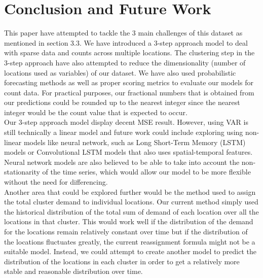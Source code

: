 \documentclass[nonblindrev,msom]{informs3} %
\begin{document}
\section{Conclusion and Future Work}

This paper have attempted to tackle the 3 main challenges of this dataset as mentioned in section 3.3. We have introduced a 3-step approach model to deal with sparse data and counts across multiple locations. The clustering step in the 3-step approach have also attempted to reduce the dimensionality (number of locations used as variables) of our dataset. We have also used probabilistic forecasting methods as well as proper scoring metrics to evaluate our models for count data. For practical purposes, our fractional numbers that is obtained from our predictions could be rounded up to the nearest integer since the nearest integer would be the count value that is expected to occur. \\

\noindent Our 3-step approach model display decent MSE result. However, using VAR is still technically a linear model and future work could include exploring using non-linear models like neural network, such as Long Short-Term Memory (LSTM) models or Convolutional LSTM models that also uses spatial-temporal features. Neural network models are also believed to be able to take into account the non-stationarity of the time series, which would allow our model to be more flexible without the need for differencing. \\

\noindent Another area that could be explored further would be the method used to assign the total cluster demand to individual locations. Our current method simply used the historical distribution of the total sum of demand of each location over all the locations in that cluster. This would work well if the distribution of the demand for the locations remain relatively constant over time but if the distribution of the locations fluctuates greatly, the current reassignment formula might not be a suitable model. Instead, we could attempt to create another model to predict the distribution of the locations in each cluster in order to get a relatively more stable and reasonable distribution over time. 

\newpage



%
%
%
\end{document}
